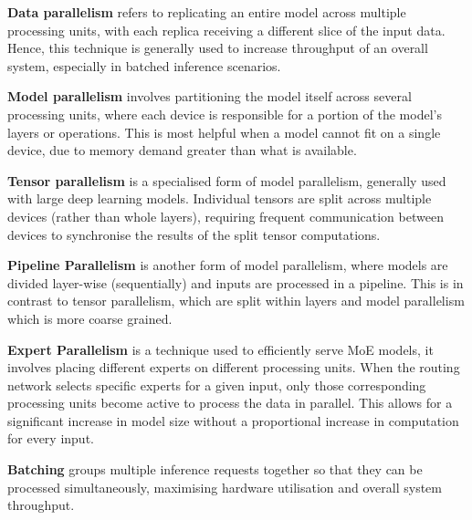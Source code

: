 
\textbf{Data parallelism} refers to replicating an entire model across multiple processing units, with each replica receiving a different slice of the input data.
Hence, this technique is generally used to increase throughput of an overall system, especially in batched inference scenarios. %

\textbf{Model parallelism} involves partitioning the model itself across several processing units, where each device is responsible for a portion of the model's layers or operations.
This is most helpful when a model cannot fit on a single device, due to memory demand greater than what is available. %

\textbf{Tensor parallelism} is a specialised form of model parallelism, generally used with large deep learning models.
Individual tensors are split across multiple devices (rather than whole layers),  requiring  frequent communication between devices to synchronise the results of the split tensor computations. %


\textbf{Pipeline Parallelism} is another form of model parallelism, where models are divided layer-wise (sequentially) and inputs are processed in a pipeline.
This is in contrast to tensor parallelism, which are split within layers and model parallelism which is more coarse grained. %

\textbf{Expert Parallelism} is a technique used to efficiently serve MoE models, it involves placing different experts on different processing units.
When the routing network selects specific experts for a given input, only those corresponding processing units become active to process the data in parallel.
This allows for a significant increase in model size without a proportional increase in computation for every input. %

\textbf{Batching} groups multiple inference requests together so that they can be processed simultaneously, maximising hardware utilisation and overall system throughput.


